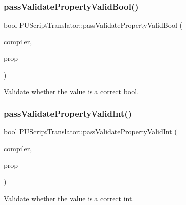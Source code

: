 \subsubsection{\texorpdfstring{pass\+Validate\+Property\+Valid\+Bool()}{passValidatePropertyValidBool()}\hspace{0.1cm}{\footnotesize\ttfamily [2/2]}}
{\footnotesize\ttfamily bool P\+U\+Script\+Translator\+::pass\+Validate\+Property\+Valid\+Bool (\begin{DoxyParamCaption}\item[{\hyperlink{classPUScriptCompiler}{P\+U\+Script\+Compiler} $\ast$}]{compiler,  }\item[{\hyperlink{classPUPropertyAbstractNode}{P\+U\+Property\+Abstract\+Node} $\ast$}]{prop }\end{DoxyParamCaption})}

Validate whether the value is a correct bool. \mbox{\label{classPUScriptTranslator_a14d7f09cb01010236a774569c20c07fa}} 
\subsubsection{\texorpdfstring{pass\+Validate\+Property\+Valid\+Int()}{passValidatePropertyValidInt()}\hspace{0.1cm}{\footnotesize\ttfamily [1/2]}}
{\footnotesize\ttfamily bool P\+U\+Script\+Translator\+::pass\+Validate\+Property\+Valid\+Int (\begin{DoxyParamCaption}\item[{\hyperlink{classPUScriptCompiler}{P\+U\+Script\+Compiler} $\ast$}]{compiler,  }\item[{\hyperlink{classPUPropertyAbstractNode}{P\+U\+Property\+Abstract\+Node} $\ast$}]{prop }\end{DoxyParamCaption})}

Validate whether the value is a correct int. \mbox{\label{classPUScriptTranslator_a14d7f09cb01010236a774569c20c07fa}} 
